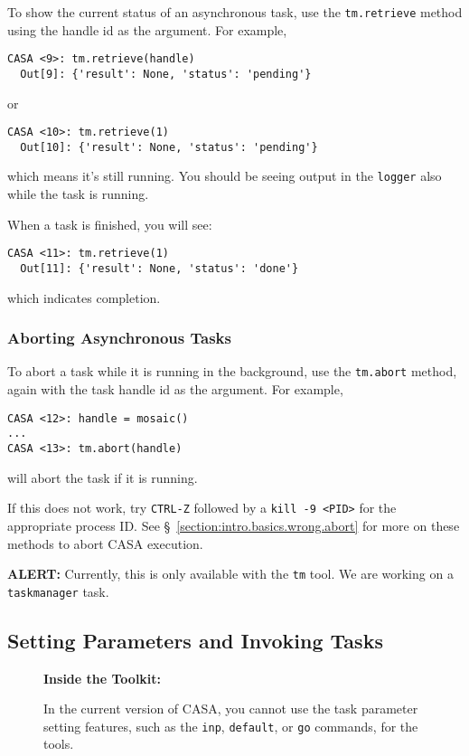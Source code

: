 To show the current status of an asynchronous task, use the
{\tt tm.retrieve} method using the handle id as the argument.
For example,
\small
\begin{verbatim}
CASA <9>: tm.retrieve(handle)
  Out[9]: {'result': None, 'status': 'pending'}
\end{verbatim}
\normalsize
or
\small
\begin{verbatim}
CASA <10>: tm.retrieve(1)
  Out[10]: {'result': None, 'status': 'pending'}
\end{verbatim}
\normalsize
which means it's still running.  You should be seeing output in
the {\tt logger} also while the task is running.  

When a task is finished, you will see:
\small
\begin{verbatim}
CASA <11>: tm.retrieve(1)
  Out[11]: {'result': None, 'status': 'done'}
\end{verbatim}
\normalsize
which indicates completion.

\subsubsection{Aborting Asynchronous Tasks}
\label{section:intro.tasks.async.abort}

To abort a task while it is running in the background, use the
{\tt tm.abort} method, again with the task handle id as the
argument.  For example,
\small
\begin{verbatim}
CASA <12>: handle = mosaic()
...
CASA <13>: tm.abort(handle)
\end{verbatim}
\normalsize
will abort the task if it is running.

If this does not work,
try {\tt CTRL-Z} followed by a {\tt kill -9 <PID>} for the appropriate
process ID.
See \S~\ref{section:intro.basics.wrong.abort} for more on these
methods to abort CASA execution.

{\bf ALERT:} Currently, this is only available with the 
{\tt tm} tool.  We are working on a {\tt taskmanager} task.

\subsection{Setting Parameters and Invoking Tasks}
\label{section:intro.tasks.setpar}

\begin{wrapfigure}{r}{2.5in}
  \begin{boxedminipage}{2.5in}
     \centerline{\bf Inside the Toolkit:}
     In the current version of CASA, you cannot use the
     task parameter setting features, such as the {\tt inp},
     {\tt default}, or {\tt go} commands, for the tools.
  \end{boxedminipage}
\end{wrapfigure}

